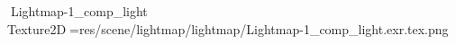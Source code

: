    Lightmap-1_comp_light            	   Texture2D   =   res/scene/lightmap/lightmap/Lightmap-1_comp_light.exr.tex.png